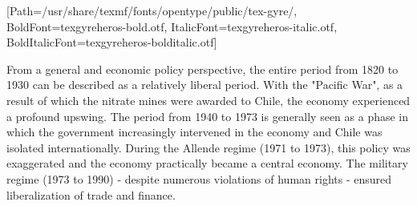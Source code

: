 \documentclass[varwidth]{standalone}
\begin{document}
\setmainfont{texgyreheros-regular.otf}%
[Path=/usr/share/texmf/fonts/opentype/public/tex-gyre/,
 BoldFont=texgyreheros-bold.otf,
 ItalicFont=texgyreheros-italic.otf,
 BoldItalicFont=texgyreheros-bolditalic.otf]
\fontsize{12}{14.4}
\selectfont{}
\setmainfont{Lato Light}
\fontsize{12pt}{17pt}\selectfont
\setlength{\columnsep}{1cm}
\begin{minipage}[t]{16.25cm}
\begin{multicols}{2} 
From a general and economic policy perspective, the entire period from
1820 to 1930 can be described as a relatively liberal period. With the
"Pacific War", as a result of which the nitrate mines were awarded to
Chile, the economy experienced a profound upswing. The period from
1940 to 1973 is generally seen as a phase in which the government
increasingly intervened in the economy and Chile was isolated
internationally. During the Allende regime (1971 to 1973), this policy
was exaggerated and the economy practically became a central
economy. The military regime (1973 to 1990) - despite numerous
violations of human rights - ensured liberalization of trade and
finance.
\end{multicols}
\end{minipage} 
\end{document}
